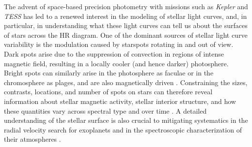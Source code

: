 \documentclass[modern,linenumbers]{aastex62}
\begin{document}
The advent of space-based precision photometry with missions such as
\emph{Kepler} \citep{Borucki2010} and \emph{TESS} \citep{Ricker2015}
has led to a renewed interest in the modeling of stellar light curves,
and, in particular, in understanding what these light curves can tell
us about the surfaces of stars across the HR diagram. One of the dominant
sources of stellar light curve variability is the modulation caused
by starspots rotating in and out of view.
Dark spots arise due to the suppression of convection in regions of
intense magnetic field, resulting in a locally cooler (and hence darker)
photosphere. Bright spots can similarly
arise in the photosphere as faculae or in the chromosphere as plages, and
are also magnetically driven \citep[e.g.,][]{Berdyugina2005}.
%
Constraining the sizes,
contrasts, locations, and number of spots on stars can therefore reveal
information about stellar magnetic activity, stellar interior structure,
and how these quantities vary across spectral type and over time
\citep[e.g.,][]{Garraffo2018}.
A detailed understanding of the stellar surface is also crucial to
mitigating systematics in the radial velocity search for exoplanets
\citep[e.g.,][]{Lanza2011} and in the spectroscopic characterization of their
atmospheres \citep[e.g.,][]{Rackham2018}.
\end{document}
